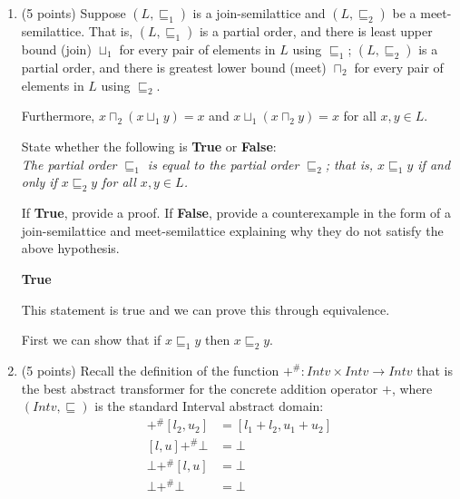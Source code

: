 \documentclass[12pt]{article}
\begin{document}
\begin{enumerate}
\begin{enumerate}
\begin{mdframed}
\end{mdframed}

\end{enumerate}
\newpage

\item (5 points) Suppose $(L, \sqsubseteq_1)$ is a join-semilattice and $(L,
\sqsubseteq_2)$ be a meet-semilattice. 
%
That is, $(L, \sqsubseteq_1)$ is a partial order, and there is least upper bound
(join) $\sqcup_1$ for every pair of elements in $L$ using $\sqsubseteq_1$; 
$(L, \sqsubseteq_2)$ is a partial order, and there is greatest
lower bound (meet) $\sqcap_2$ for every pair of elements in $L$ using
$\sqsubseteq_2$. 

Furthermore, $x \sqcap_2 (x \sqcup_1 y) = x$ and $x \sqcup_1 (x \sqcap_2 y) = x$
for all $x, y \in L$. 

State whether the following is \textbf{True} or \textbf{False}:\\
\emph{The partial order $\sqsubseteq_1$ is equal to the partial order $\sqsubseteq_2$; 
that is, $x \sqsubseteq_1 y$ if and only if $x \sqsubseteq_2 y$ for all $x, y \in L$.}

If \textbf{True}, provide a proof. 
If \textbf{False}, provide a counterexample in the form 
of a join-semilattice and meet-semilattice explaining why they do not satisfy 
the above hypothesis.
\begin{mdframed}
  
  \textbf{True} 

    This statement is true and we can prove this through equivalence.

    First we can show that if $x \sqsubseteq_1 y$ then $x \sqsubseteq_2 y$.


    
  
  \end{mdframed}
\emph{}


\item (5 points)
Recall the definition of the function $+^{\#} \colon Intv \times Intv \to Intv$
that is the best abstract transformer for the concrete addition operator $+$,
where $(Intv, \sqsubseteq)$ is the standard Interval abstract domain:
\begin{align*}
  [l_1, u_1] +^{\#} [l_2, u_2] &= [l_1 + l_2, u_1 + u_2] \\
  [l, u] +^{\#} \bot &= \bot \\ 
  \bot +^{\#} [l, u] &= \bot \\ 
  \bot +^{\#} \bot &= \bot 
\end{align*}


\end{enumerate}
\end{document}
